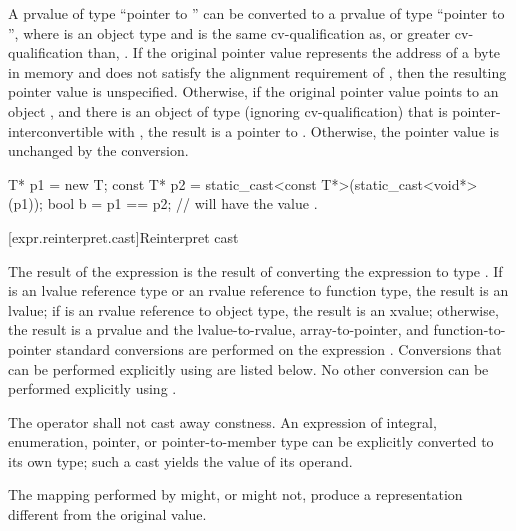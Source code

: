 \pnum
A prvalue of type ``pointer to  '' can be
converted to a prvalue of type ``pointer to  '',
where  is an object type and  is the same
cv-qualification as, or greater cv-qualification than, .
If the original pointer value represents the address
 of a byte in memory and
 does not satisfy the alignment requirement of ,
then the resulting pointer value is unspecified.
Otherwise, if the original pointer value points to an object ,
and there is an object  of type  (ignoring cv-qualification)
that is pointer-interconvertible with ,
the result is a pointer to .
Otherwise, the pointer value is unchanged by the conversion.
\begin{example}

\begin{codeblock}
T* p1 = new T;
const T* p2 = static_cast<const T*>(static_cast<void*>(p1));
bool b = p1 == p2;  //  will have the value .
\end{codeblock}
\end{example}

[expr.reinterpret.cast]{Reinterpret cast}

\pnum
{}%
%
The result of the expression  is the
result of converting the expression  to type .
%
%
If  is an lvalue reference type or an rvalue reference to function type, the result is an lvalue;
if  is an rvalue reference to object type, the result is an xvalue;
otherwise, the result is a prvalue and the
lvalue-to-rvalue, array-to-pointer,
and function-to-pointer standard conversions are
performed on the expression . Conversions that can be performed explicitly
using  are listed below. No other conversion can
be performed explicitly using .

\pnum
The  operator shall not cast away constness.
An expression of integral, enumeration, pointer, or pointer-to-member type
can be explicitly converted to its own type; such a cast yields the value of
its operand.

\pnum
\begin{note}
The mapping performed by  might, or might not, produce a
representation different from the original value.
\end{note}


